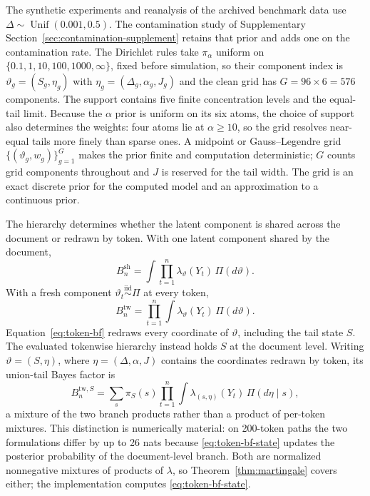 \documentclass[11pt]{article}
\newcommand{\Unif}{\operatorname{Unif}}
\begin{document}
The synthetic experiments and reanalysis of the archived benchmark data use $\Delta\sim\Unif(0.001,0.5)$.  The contamination study of Supplementary Section~\ref{sec:contamination-supplement} retains that prior and adds one on the contamination rate.  The Dirichlet rules take $\pi_\alpha$ uniform on $\{0.1,1,10,100,1000,\infty\}$, fixed before simulation, so their component index is $\vartheta_g=(S_g,\eta_g)$ with $\eta_g=(\Delta_g,\alpha_g,J_g)$ and the clean grid has $G=96\times6=576$ components.  The support contains five finite concentration levels and the equal-tail limit.  Because the $\alpha$ prior is uniform on its six atoms, the choice of support also determines the weights: four atoms lie at $\alpha\ge10$, so the grid resolves near-equal tails more finely than sparse ones.  A midpoint or Gauss--Legendre grid $\{(\vartheta_g,w_g)\}_{g=1}^G$ makes the prior finite and computation deterministic; $G$ counts grid components throughout and $J$ is reserved for the tail width.  The grid is an exact discrete prior for the computed model and an approximation to a continuous prior.

The hierarchy determines whether the latent component is shared across the document or redrawn by token.  With one latent component shared by the document,
\begin{equation}
  B_n^{\mathrm{sh}}
  =\int\prod_{t=1}^n\lambda_\vartheta(Y_t)\,\Pi(d\vartheta).
  \label{eq:shared-bf}
\end{equation}
With a fresh component $\vartheta_t\stackrel{\mathrm{iid}}{\sim}\Pi$ at every token,
\begin{equation}
  B_n^{\mathrm{tw}}
  =\prod_{t=1}^n\int\lambda_\vartheta(Y_t)\,\Pi(d\vartheta).
  \label{eq:token-bf}
\end{equation}
Equation~\eqref{eq:token-bf} redraws every coordinate of $\vartheta$, including
the tail state $S$.  The evaluated tokenwise hierarchy instead holds $S$ at the
document level.  Writing $\vartheta=(S,\eta)$, where
$\eta=(\Delta,\alpha,J)$ contains the coordinates redrawn by token, its union-tail
Bayes factor is
\begin{equation}
  B_n^{\mathrm{tw},S}
  =\sum_{s}\pi_S(s)\prod_{t=1}^n\int\lambda_{(s,\eta)}(Y_t)\,\Pi(d\eta\mid s),
  \label{eq:token-bf-state}
\end{equation}
a mixture of the two branch products rather than a product of per-token mixtures.
This distinction is numerically material: on 200-token paths the two formulations
differ by up to 26 nats because \eqref{eq:token-bf-state} updates the posterior
probability of the document-level branch.  Both are normalized
nonnegative mixtures of products of $\lambda$, so Theorem~\ref{thm:martingale}
covers either; the implementation computes \eqref{eq:token-bf-state}.
\end{document}
